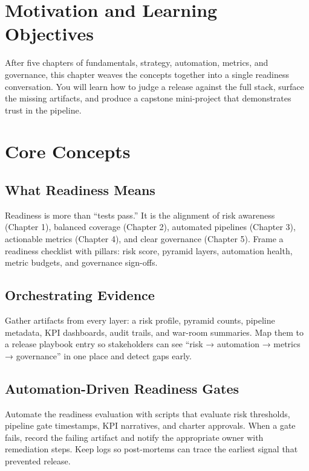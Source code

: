 \section{Motivation and Learning Objectives}

After five chapters of fundamentals, strategy, automation, metrics, and governance, this chapter weaves the concepts together into a single readiness conversation. You will learn how to judge a release against the full stack, surface the missing artifacts, and produce a capstone mini-project that demonstrates trust in the pipeline.

\section{Core Concepts}

\subsection{What Readiness Means}

Readiness is more than “tests pass.” It is the alignment of risk awareness (Chapter 1), balanced coverage (Chapter 2), automated pipelines (Chapter 3), actionable metrics (Chapter 4), and clear governance (Chapter 5). Frame a readiness checklist with pillars: risk score, pyramid layers, automation health, metric budgets, and governance sign-offs.

\subsection{Orchestrating Evidence}

Gather artifacts from every layer: a risk profile, pyramid counts, pipeline metadata, KPI dashboards, audit trails, and war-room summaries. Map them to a release playbook entry so stakeholders can see “risk → automation → metrics → governance” in one place and detect gaps early.

\subsection{Automation-Driven Readiness Gates}

Automate the readiness evaluation with scripts that evaluate risk thresholds, pipeline gate timestamps, KPI narratives, and charter approvals. When a gate fails, record the failing artifact and notify the appropriate owner with remediation steps. Keep logs so post-mortems can trace the earliest signal that prevented release.

